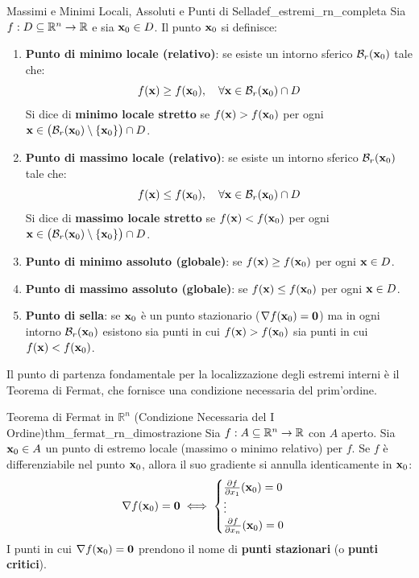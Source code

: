 \begin{definizione}{Massimi e Minimi Locali, Assoluti e Punti di Sella}{def_estremi_rn_completa}
Sia $f: D \subseteq \mathbb{R}^n \to \mathbb{R}$ e sia $\mathbf{x}_0 \in D$. Il punto $\mathbf{x}_0$ si definisce:
\begin{enumerate}
    \item \textbf{Punto di minimo locale (relativo)}: se esiste un intorno sferico $\mathcal{B}_r(\mathbf{x}_0)$ tale che:
    \[
    f(\mathbf{x}) \ge f(\mathbf{x}_0), \quad \forall \mathbf{x} \in \mathcal{B}_r(\mathbf{x}_0) \cap D
    \]
    Si dice di \textbf{minimo locale stretto} se $f(\mathbf{x}) > f(\mathbf{x}_0)$ per ogni $\mathbf{x} \in \big(\mathcal{B}_r(\mathbf{x}_0) \setminus \{\mathbf{x}_0\}\big) \cap D$.
    
    \item \textbf{Punto di massimo locale (relativo)}: se esiste un intorno sferico $\mathcal{B}_r(\mathbf{x}_0)$ tale che:
    \[
    f(\mathbf{x}) \le f(\mathbf{x}_0), \quad \forall \mathbf{x} \in \mathcal{B}_r(\mathbf{x}_0) \cap D
    \]
    Si dice di \textbf{massimo locale stretto} se $f(\mathbf{x}) < f(\mathbf{x}_0)$ per ogni $\mathbf{x} \in \big(\mathcal{B}_r(\mathbf{x}_0) \setminus \{\mathbf{x}_0\}\big) \cap D$.
    
    \item \textbf{Punto di minimo assoluto (globale)}: se $f(\mathbf{x}) \ge f(\mathbf{x}_0)$ per ogni $\mathbf{x} \in D$.
    \item \textbf{Punto di massimo assoluto (globale)}: se $f(\mathbf{x}) \le f(\mathbf{x}_0)$ per ogni $\mathbf{x} \in D$.
    
    \item \textbf{Punto di sella}: se $\mathbf{x}_0$ è un punto stazionario ($\nabla f(\mathbf{x}_0) = \mathbf{0}$) ma in ogni intorno $\mathcal{B}_r(\mathbf{x}_0)$ esistono sia punti in cui $f(\mathbf{x}) > f(\mathbf{x}_0)$ sia punti in cui $f(\mathbf{x}) < f(\mathbf{x}_0)$.
\end{enumerate}
\end{definizione}

Il punto di partenza fondamentale per la localizzazione degli estremi interni è il Teorema di Fermat, che fornisce una condizione necessaria del prim'ordine.

\begin{teorema}{Teorema di Fermat in $\mathbb{R}^n$ (Condizione Necessaria del I Ordine)}{thm_fermat_rn_dimostrazione}
Sia $f: A \subseteq \mathbb{R}^n \to \mathbb{R}$ con $A$ aperto. Sia $\mathbf{x}_0 \in A$ un punto di estremo locale (massimo o minimo relativo) per $f$.
Se $f$ è differenziabile nel punto $\mathbf{x}_0$, allora il suo gradiente si annulla identicamente in $\mathbf{x}_0$:
\[
\nabla f(\mathbf{x}_0) = \mathbf{0} \iff \begin{cases}
\frac{\partial f}{\partial x_1}(\mathbf{x}_0) = 0 \\
\vdots \\
\frac{\partial f}{\partial x_n}(\mathbf{x}_0) = 0
\end{cases}
\]
I punti in cui $\nabla f(\mathbf{x}_0) = \mathbf{0}$ prendono il nome di \textbf{punti stazionari} (o \textbf{punti critici}).
\end{teorema}

